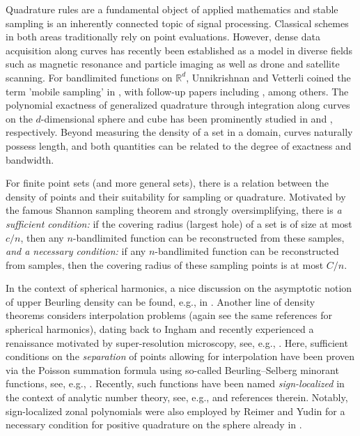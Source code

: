 \documentclass[11pt,a4paper,twoside,final,biblatex]{scrartcl}
\newcommand{\R}{\ensuremath{\mathbb{R}}}
\theoremstyle{definition}
\numberwithin{equation}{section}
\numberwithin{table}{section}
\numberwithin{figure}{section}
\begin{document}
Quadrature rules are a fundamental object of applied mathematics and stable sampling is an inherently connected topic of signal processing.
Classical schemes in both areas traditionally rely on point evaluations. However, dense data acquisition along curves has recently been established as a model in diverse fields such as magnetic resonance and particle imaging as well as drone and satellite scanning.
For bandlimited functions on $\R^d$, Unnikrishnan and Vetterli coined the term 'mobile sampling' in \cite{UnVe13}, with follow-up papers including \cite{JaNeRo21,RaUlZl23,JaMiVe24}, among others.
The polynomial exactness of generalized quadrature through integration along curves on the $d$-dimensional sphere and cube has been prominently studied in \cite{EhGr23,EhGrKa25,Li24,EhGr26,KiMi26} and \cite{BoDeVi17}, respectively.
Beyond measuring the density of a set in a domain, curves naturally possess length, and both quantities can be related to the degree of exactness and bandwidth.

For finite point sets (and more general sets), there is a relation between the density of points and their suitability for sampling or quadrature.
Motivated by the famous Shannon sampling theorem and strongly oversimplifying, there is \emph{a sufficient condition:} if the covering radius (largest hole) of a set is of size at most $c/n$, then any $n$-bandlimited function can be reconstructed from these samples, \emph{and a necessary condition:} if any $n$-bandlimited function can be reconstructed from samples, then the covering radius of these sampling points is at most $C/n$.

In the context of spherical harmonics, a nice discussion on the asymptotic notion of upper Beurling density can be found, e.g., in \cite{Ma07,MaPr14}.
Another line of density theorems considers interpolation problems (again see the same references for spherical harmonics), dating back to Ingham and recently experienced a renaissance motivated by super-resolution microscopy, see, e.g., \cite{Mo15,KuNaSt22,HoKu23}.
Here, sufficient conditions on the \emph{separation} of points allowing for interpolation have been proven via the Poisson summation formula using so-called Beurling--Selberg minorant functions, see, e.g., \cite[Thm.~3.8]{HoKu23}.
Recently, such functions have been named \emph{sign-localized} in the context of analytic number theory, see, e.g., \cite{CoDoGo24} and references therein.
Notably, sign-localized zonal polynomials were also employed by Reimer and Yudin for a necessary condition for positive quadrature on the sphere already in \cite[Thm.~6.21]{Re03}.
\end{document}
